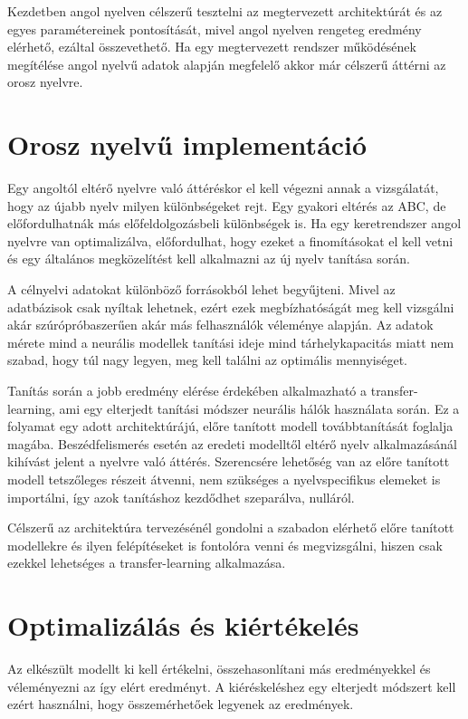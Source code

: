 Kezdetben angol nyelven célszerű tesztelni az megtervezett architektúrát és az egyes paramétereinek pontosítását, mivel angol nyelven rengeteg eredmény elérhető, ezáltal összevethető. Ha egy megtervezett rendszer működésének megítélése angol nyelvű adatok alapján megfelelő akkor már célszerű áttérni az orosz nyelvre. 

\section{Orosz nyelvű implementáció}

Egy angoltól eltérő nyelvre való áttéréskor el kell végezni annak a vizsgálatát, hogy az újabb nyelv milyen különbségeket rejt. Egy gyakori eltérés az ABC, de előfordulhatnák más előfeldolgozásbeli   különbségek is. Ha egy keretrendszer angol nyelvre van optimalizálva, előfordulhat, hogy ezeket a finomításokat el kell vetni és egy általános megközelítést kell alkalmazni az új nyelv tanítása során.

A célnyelvi adatokat különböző forrásokból lehet begyűjteni. Mivel az adatbázisok csak nyíltak lehetnek, ezért ezek megbízhatóságát meg kell vizsgálni akár szúrópróbaszerűen akár más felhasználók véleménye alapján. Az adatok mérete mind a neurális modellek tanítási ideje mind tárhelykapacitás miatt nem szabad, hogy túl nagy legyen, meg kell találni az optimális mennyiséget.

Tanítás során a jobb eredmény elérése érdekében alkalmazható a transfer-learning, ami egy elterjedt tanítási módszer neurális hálók használata során. Ez a folyamat egy adott architektúrájú, előre tanított modell továbbtanítását foglalja magába. Beszédfelismerés esetén az eredeti modelltől eltérő nyelv alkalmazásánál kihívást jelent a nyelvre való áttérés. Szerencsére lehetőség van az előre tanított modell tetszőleges részeit átvenni, nem szükséges a nyelvspecifikus elemeket is importálni, így azok tanításhoz kezdődhet szeparálva, nulláról.

Célszerű az architektúra tervezésénél gondolni a szabadon elérhető előre tanított modellekre és ilyen felépítéseket is fontolóra venni és megvizsgálni, hiszen csak ezekkel lehetséges a transfer-learning alkalmazása.

\section{Optimalizálás és kiértékelés}

Az elkészült modellt ki kell értékelni, összehasonlítani más eredményekkel és véleményezni az így elért eredményt. A kiéréskeléshez egy elterjedt módszert kell ezért használni, hogy összemérhetőek legyenek az eredmények.

